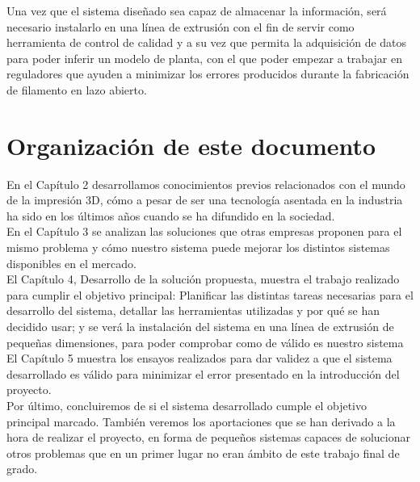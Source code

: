 Una vez que el sistema diseñado sea capaz de almacenar la información, será necesario instalarlo en una línea de extrusión con el fin de servir como herramienta de control de calidad y a su vez que permita la adquisición de datos para poder inferir un modelo de planta, con el que poder empezar a trabajar en reguladores que ayuden a minimizar los errores producidos durante la fabricación de filamento en lazo abierto.\\
\newpage
\section{Organización de este documento}
\label{sec:organizacion}

En el Capítulo 2 desarrollamos conocimientos previos relacionados con el mundo de la impresión 3D, cómo a pesar de ser una tecnología asentada en la industria ha sido en los últimos años cuando se ha difundido en la sociedad.\\

En el Capítulo 3 se analizan las soluciones que otras empresas proponen para el mismo problema y cómo nuestro sistema puede mejorar los distintos sistemas disponibles en el mercado.\\

El Capítulo 4, Desarrollo de la solución propuesta, muestra el trabajo realizado para cumplir el objetivo principal: Planificar las distintas tareas necesarias para el desarrollo del sistema, detallar las herramientas utilizadas y por qué se han decidido usar; y se verá la instalación del sistema en una línea de extrusión de pequeñas dimensiones, para poder comprobar como de válido es nuestro sistema\\

El Capítulo 5 muestra los ensayos realizados para dar validez a que el sistema desarrollado es válido para minimizar el error presentado en la introducción del proyecto.\\

Por último, concluiremos de si el sistema desarrollado cumple el objetivo principal marcado. También veremos los aportaciones que se han derivado a la hora de realizar el proyecto, en forma de pequeños sistemas capaces de solucionar otros problemas que en un primer lugar no eran ámbito de este trabajo final de grado.